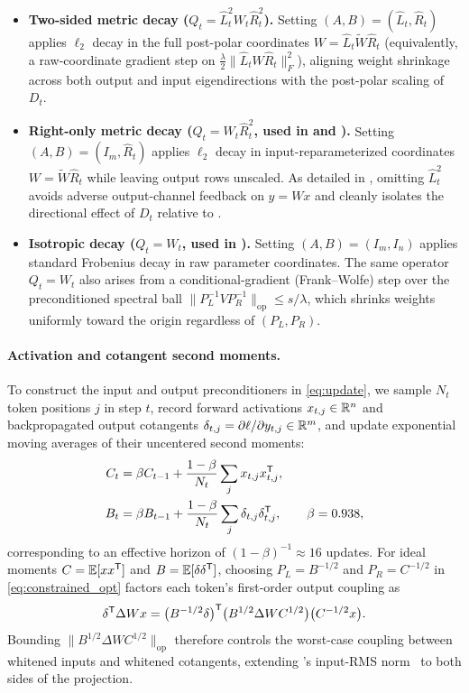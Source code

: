 \begin{itemize}
 \item \textbf{Two-sided metric decay ($Q_t=\hat L_t^2 W_t\hat R_t^2$).} Setting $(A,B)=(\hat L_t,\hat R_t)$ applies $\ell_2$ decay in the full post-polar coordinates $W=\hat L_t\widetilde W\hat R_t$ (equivalently, a raw-coordinate gradient step on $\frac{\lambda}{2}\|\hat L_t W\hat R_t\|_F^2$), aligning weight shrinkage across both output and input eigendirections with the post-polar scaling of $D_t$.
 \item \textbf{Right-only metric decay ($Q_t=W_t\hat R_t^2$, used in  and ).} Setting $(A,B)=(I_m,\hat R_t)$ applies $\ell_2$ decay in input-reparameterized coordinates $W=\widetilde W\hat R_t$ while leaving output rows unscaled. As detailed in , omitting $\hat L_t^2$ avoids adverse output-channel feedback on $y=Wx$ and cleanly isolates the directional effect of $D_t$ relative to .
 \item \textbf{Isotropic decay ($Q_t=W_t$, used in ).} Setting $(A,B)=(I_m,I_n)$ applies standard Frobenius decay in raw parameter coordinates. The same operator $Q_t=W_t$ also arises from a conditional-gradient (Frank--Wolfe) step over the preconditioned spectral ball $\|P_L^{-1}VP_R^{-1}\|_{\mathrm{op}}\le s/\lambda$, which shrinks weights uniformly toward the origin regardless of $(P_L,P_R)$.
\end{itemize}

\paragraph{Activation and cotangent second moments.}
To construct the input and output preconditioners in \cref{eq:update}, we sample $N_t$ token positions $j$ in step $t$, record forward activations $x_{t,j}\in\mathbb{R}^n$ and backpropagated output cotangents $\delta_{t,j}=\partial\ell/\partial y_{t,j}\in\mathbb{R}^m$, and update exponential moving averages of their uncentered second moments:
\begin{align}
 C_t&=\beta C_{t-1}+\frac{1-\beta}{N_t}\sum_j x_{t,j}x_{t,j}^{{\mathsf{T}}},\nonumber\\
 B_t&=\beta B_{t-1}+\frac{1-\beta}{N_t}\sum_j\delta_{t,j}\delta_{t,j}^{{\mathsf{T}}},
 \qquad \beta=0.938,
 \label{eq:moments}
\end{align}
corresponding to an effective horizon of $(1-\beta)^{-1}\approx 16$ updates. For ideal moments $C=\mathbb{E}[xx^{{\mathsf{T}}}]$ and $B=\mathbb{E}[\delta\delta^{{\mathsf{T}}}]$, choosing $P_L=B^{-1/2}$ and $P_R=C^{-1/2}$ in \cref{eq:constrained_opt} factors each token's first-order output coupling as
\[
 \delta^{{\mathsf{T}}}\Delta W x
 =\bigl(B^{-1/2}\delta\bigr)^{{\mathsf{T}}}
  \bigl(B^{1/2}\Delta W C^{1/2}\bigr)
  \bigl(C^{-1/2}x\bigr).
\]
Bounding $\|B^{1/2}\Delta W C^{1/2}\|_{\mathrm{op}}$ therefore controls the worst-case coupling between whitened inputs and whitened cotangents, extending 's input-RMS norm~\citep{mohamadi2026toner} to both sides of the projection.

